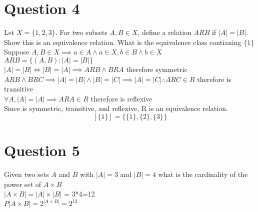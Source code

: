 \documentclass[11pt]{article}
\theoremstyle{plain}
\begin{document}
\section{Question 4}
Let $X = \{1,2,3\}.$ For two subsets $A,B \in X$, define a relation $ARB$ if $|A| = |B|$. Show this is an equivalence relation. What is the equivalence class contianing $\{1\}$\\
Suppose $A,B \in X \implies a \in A \land a \in X, b \in B \land b \in X$\\
$ARB = \{(A,B) : |A| = |B|\}$ \\
$|A| = |B| \iff |B| = |A| \implies ARB \land BRA$ therefore symmetric\\
$ARB \land BRC \implies |A| = |B| \land |B| = |C| \implies |A| = |C| \therefore ARC \in R$ therefore is transitive\\
$\forall A, |A| = |A| \implies ARA \in R$ therefore is reflexive\\
Since is symmetric, transitive, and reflexive, R is an equivalence relation.
$$[\{1\}]=\{\{1\}, \{2\}, \{3\}\} $$

\section{Question 5}
Given two sets $A$ and $B$ with $|A|=3$ and $|B|=4$ what is the cardinality of the power set of $A \times B$\\
$|A \times B| = |A| \times |B|$ = 3*4=12\\
$P|A \times B| = 2^{|A \times B|} = 2^{12}$
\end{document}
